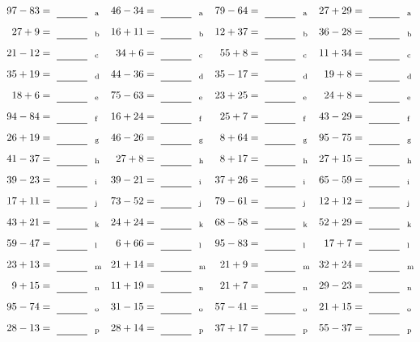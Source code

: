 \documentclass
[
  draft    = true,
  fontsize = 11pt,
  parskip  = half-
]
{scrartcl}
\begin{document}
\clearpage
\begin{align*}
    \pline{97-83}&=\rline{a}
  & \pline{46-34}&=\rline{a}
  & \pline{79-64}&=\rline{a}
  & \pline{27+29}&=\rline{a} \\[1ex]
    \pline{27+9}&=\rline{b}
  & \pline{16+11}&=\rline{b}
  & \pline{12+37}&=\rline{b}
  & \pline{36-28}&=\rline{b} \\[1ex]
    \pline{21-12}&=\rline{c}
  & \pline{34+6}&=\rline{c}
  & \pline{55+8}&=\rline{c}
  & \pline{11+34}&=\rline{c} \\[1ex]
    \pline{35+19}&=\rline{d}
  & \pline{44-36}&=\rline{d}
  & \pline{35-17}&=\rline{d}
  & \pline{19+8}&=\rline{d} \\[1ex]
    \pline{18+6}&=\rline{e}
  & \pline{75-63}&=\rline{e}
  & \pline{23+25}&=\rline{e}
  & \pline{24+8}&=\rline{e} \\[1ex]
    \pline{94-84}&=\rline{f}
  & \pline{16+24}&=\rline{f}
  & \pline{25+7}&=\rline{f}
  & \pline{43-29}&=\rline{f} \\[1ex]
    \pline{26+19}&=\rline{g}
  & \pline{46-26}&=\rline{g}
  & \pline{8+64}&=\rline{g}
  & \pline{95-75}&=\rline{g} \\[1ex]
    \pline{41-37}&=\rline{h}
  & \pline{27+8}&=\rline{h}
  & \pline{8+17}&=\rline{h}
  & \pline{27+15}&=\rline{h} \\[1ex]
    \pline{39-23}&=\rline{i}
  & \pline{39-21}&=\rline{i}
  & \pline{37+26}&=\rline{i}
  & \pline{65-59}&=\rline{i} \\[1ex]
    \pline{17+11}&=\rline{j}
  & \pline{73-52}&=\rline{j}
  & \pline{79-61}&=\rline{j}
  & \pline{12+12}&=\rline{j} \\[1ex]
    \pline{43+21}&=\rline{k}
  & \pline{24+24}&=\rline{k}
  & \pline{68-58}&=\rline{k}
  & \pline{52+29}&=\rline{k} \\[1ex]
    \pline{59-47}&=\rline{l}
  & \pline{6+66}&=\rline{l}
  & \pline{95-83}&=\rline{l}
  & \pline{17+7}&=\rline{l} \\[1ex]
    \pline{23+13}&=\rline{m}
  & \pline{21+14}&=\rline{m}
  & \pline{21+9}&=\rline{m}
  & \pline{32+24}&=\rline{m} \\[1ex]
    \pline{9+15}&=\rline{n}
  & \pline{11+19}&=\rline{n}
  & \pline{21+7}&=\rline{n}
  & \pline{29-23}&=\rline{n} \\[1ex]
    \pline{95-74}&=\rline{o}
  & \pline{31-15}&=\rline{o}
  & \pline{57-41}&=\rline{o}
  & \pline{21+15}&=\rline{o} \\[1ex]
    \pline{28-13}&=\rline{p}
  & \pline{28+14}&=\rline{p}
  & \pline{37+17}&=\rline{p}
  & \pline{55-37}&=\rline{p}
\end{align*}
\end{document}
